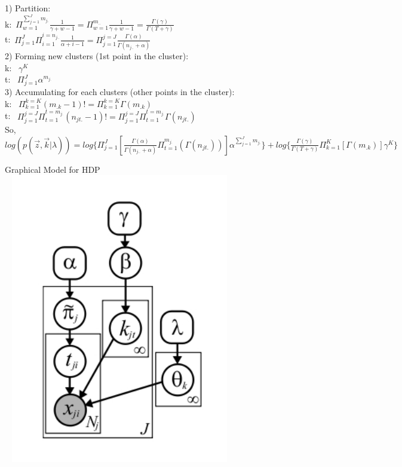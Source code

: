 \documentclass{article}
\begin{document}
\begin{spacing}{1.1}
1) Partition:\\
k:\ $\Pi_{w=1}^{\sum_{j=1}^{J}m_{j.}}\frac{1}{\gamma+w-1}=\Pi_{w=1}^{m_{..}}\frac{1}{\gamma+w-1}=\frac{\Gamma(\gamma)}{\Gamma(T+\gamma)}$\\ 
t:\ $\Pi_{j=1}^{J}\Pi_{i=1}^{i=n_{j..}}\frac{1}{\alpha+i-1}=\Pi_{j=1}^{j=J}\frac{\Gamma(\alpha)}{\Gamma(n_{j..}+\alpha)}$\\ 

2) Forming new clusters (1st point in the cluster): \\
k: \ $\gamma^{K}$\\ 
t: \ $\Pi_{j=1}^{J}\alpha^{m_{j.}}$\\ 

3) Accumulating for each clusters (other points in the cluster): \\
k: \ $\Pi_{k=1}^{k=K}(m_{.k}-1)!=\Pi_{k=1}^{k=K}\Gamma(m_{.k})$\\ 
t: \ $\Pi_{j=1}^{j=J}\Pi_{t=1}^{t=m_{j.}}(n_{jt.}-1)!=\Pi_{j=1}^{j=J}\Pi_{t=1}^{t=m_{j.}}\Gamma(n_{jt.})$\\ 

So,$log(p(\vec z,\vec k|\lambda))=log\{\Pi_{j=1}^{J}[\frac{\Gamma(\alpha)}{\Gamma(n_{j..}+\alpha)}\Pi_{t=1}^{m_{j.}}(\Gamma(n_{jt.}))]\alpha^{\sum_{j=1}^{J}m_{j.}}\}
 +log\{\frac{\Gamma(\gamma)}{\Gamma(T+\gamma)}\Pi_{k=1}^{K} [\Gamma(m_{.k})] \gamma^{K}\}$

\begin{center}
Graphical Model for HDP\\
    \includegraphics[width=4in,height=5in]{hdp.jpg} 
\end{center}




\end{spacing}
\end{document}
